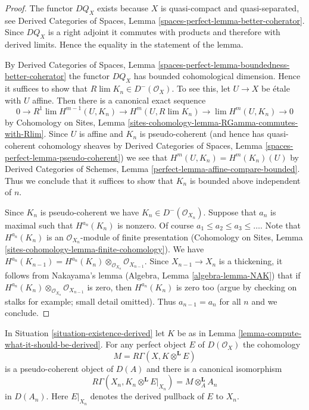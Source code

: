 \begin{proof}
The functor $DQ_X$ exists because $X$ is quasi-compact and
quasi-separated, see Derived Categories of Spaces, Lemma
\ref{spaces-perfect-lemma-better-coherator}.
Since $DQ_X$ is a right adjoint it commutes with products
and therefore with derived limits. Hence the equality
in the statement of the lemma.

\medskip\noindent
By Derived Categories of Spaces,
Lemma \ref{spaces-perfect-lemma-boundedness-better-coherator}
the functor $DQ_X$ has bounded cohomological dimension.
Hence it suffices to show that $R\lim K_n \in D^-(\mathcal{O}_X)$.
To see this, let $U \to X$ be \'etale with $U$ affine.
Then there is a canonical exact sequence
$$
0 \to
R^1\lim H^{m - 1}(U, K_n) \to H^m(U, R\lim K_n) \to
\lim H^m(U, K_n) \to 0
$$
by Cohomology on Sites, Lemma
\ref{sites-cohomology-lemma-RGamma-commutes-with-Rlim}.
Since $U$ is affine and $K_n$ is pseudo-coherent (and hence has
quasi-coherent cohomology sheaves by
Derived Categories of Spaces, Lemma \ref{spaces-perfect-lemma-pseudo-coherent})
we see that $H^m(U, K_n) = H^m(K_n)(U)$ by
Derived Categories of Schemes, Lemma \ref{perfect-lemma-affine-compare-bounded}.
Thus we conclude that it suffices to show that $K_n$
is bounded above independent of $n$.

\medskip\noindent
Since $K_n$ is pseudo-coherent we have $K_n \in D^-(\mathcal{O}_{X_n})$.
Suppose that $a_n$ is maximal such that $H^{a_n}(K_n)$ is nonzero.
Of course $a_1 \leq a_2 \leq a_3 \leq \ldots$.
Note that $H^{a_n}(K_n)$ is an
$\mathcal{O}_{X_n}$-module of finite presentation
(Cohomology on Sites, Lemma
\ref{sites-cohomology-lemma-finite-cohomology}).
We have $H^{a_n}(K_{n - 1}) =
H^{a_n}(K_n) \otimes_{\mathcal{O}_{X_n}} \mathcal{O}_{X_{n - 1}}$.
Since $X_{n - 1} \to X_n$ is a thickening, it follows from
Nakayama's lemma (Algebra, Lemma \ref{algebra-lemma-NAK}) that if
$H^{a_n}(K_n) \otimes_{\mathcal{O}_{X_n}} \mathcal{O}_{X_{n - 1}}$
is zero, then $H^{a_n}(K_n)$ is zero too (argue by checking on stalks
for example; small detail omitted).
Thus $a_{n - 1} = a_n$ for all $n$ and we conclude.
\end{proof}

\begin{lemma}
\label{lemma-compute-against-perfect-derived}
In Situation \ref{situation-existence-derived} let $K$ be as in
Lemma \ref{lemma-compute-what-it-should-be-derived}. For any perfect
object $E$ of $D(\mathcal{O}_X)$ the cohomology
$$
M = R\Gamma(X, K \otimes^\mathbf{L} E)
$$
is a pseudo-coherent object of $D(A)$ and there is a canonical isomorphism
$$
R\Gamma(X_n, K_n \otimes^\mathbf{L} E|_{X_n}) = M \otimes_A^\mathbf{L} A_n
$$
in $D(A_n)$. Here $E|_{X_n}$ denotes the derived pullback of $E$ to $X_n$.
\end{lemma}

